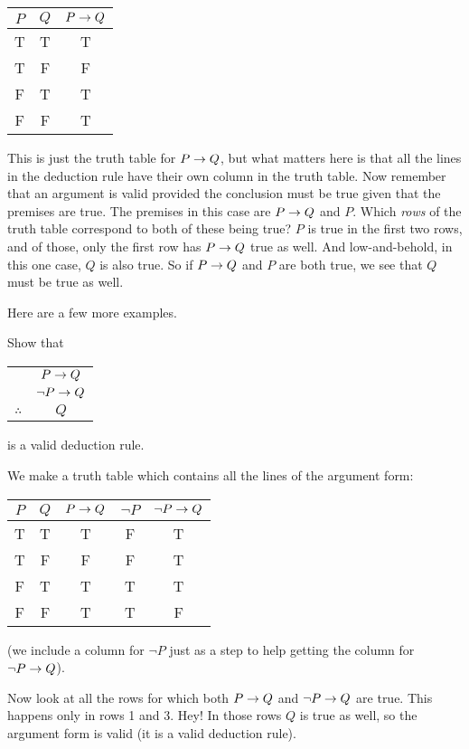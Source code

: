 \documentclass[12pt]{article}
\begin{document}
\begin{center}
 \begin{tabular}{c|c||c}
  $P$ & $Q$ & $P\rightarrow Q$ \\ \hline
  T & T & T \\
  T & F & F \\
  F & T & T \\
  F & F & T
 \end{tabular}
\end{center}

This is just the truth table for $P \rightarrow Q$, but what matters here is that all the lines in the deduction rule have their own column in the truth table.  Now remember that an argument is valid provided the conclusion must be true given that the premises are true.  The premises in this case are $P \rightarrow Q$ and $P$.  Which {\em rows} of the truth table correspond to both of these being true?  $P$ is true in the first two rows, and of those, only the first row has $P \rightarrow Q$ true as well.   And low-and-behold, in this one case, $Q$ is also true.  So if $P\rightarrow Q$ and $P$ are both true, we see that $Q$ must be true as well.

Here are a few more examples.

\begin{example}
 Show that 
 \begin{center}
  \begin{tabular}{rc}
   & $P \rightarrow Q$\\
   & $\neg P \rightarrow Q$ \\ \hline
   $\therefore$ & $Q$
  \end{tabular}
 \end{center}
is a valid deduction rule.

\begin{solution}
 We make a truth table which contains all the lines of the argument form:
 \begin{center}
  \begin{tabular}{c|c||c|c|c}
   $P$ & $Q$ & $P\rightarrow Q$ & $\neg P$ & $\neg P \rightarrow Q$ \\ \hline
   T & T & T & F & T \\ 
   T & F & F & F & T \\
   F & T & T & T & T \\
   F & F & T & T & F 
  \end{tabular}
 \end{center}
(we include a column for $\neg P$ just as a step to help getting the column for $\neg P \rightarrow Q$). 

Now look at all the rows for which both $P \rightarrow Q$ and $\neg P \rightarrow Q$ are true.  This happens only in rows 1 and 3.  Hey! In those rows $Q$ is true as well, so the argument form is valid (it is a valid deduction rule).
\end{solution}

\end{example}
\end{document}
